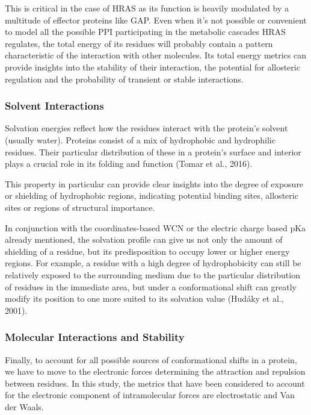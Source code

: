 \documentclass{article}
\begin{document}
This is critical in the case of HRAS as its function is heavily modulated by a multitude of effector proteins like GAP. Even when it’s not possible or convenient to model all the possible PPI participating in the metabolic cascades HRAS regulates, the total energy of its residues will probably contain a pattern characteristic of the interaction with other molecules. Its total energy metrics can provide insights into the stability of their interaction, the potential for allosteric regulation and the probability of transient or stable interactions.

\subsubsection{Solvent Interactions}

Solvation energies reflect how the residues interact with the protein’s solvent (usually water). Proteins consist of a mix of hydrophobic and hydrophilic residues. Their particular distribution of these in a protein’s surface and interior plays a crucial role in its folding and function (Tomar et al., 2016).

This property in particular can provide clear insights into the degree of exposure or shielding of hydrophobic regions, indicating potential binding sites, allosteric sites or regions of structural importance.

In conjunction with the coordinates-based WCN or the electric charge based pKa already mentioned, the solvation profile can give us not only the amount of shielding of a residue, but its predisposition to occupy lower or higher energy regions. For example, a residue with a high degree of hydrophobicity can still be relatively exposed to the surrounding medium due to the particular distribution of residues in the immediate area, but under a conformational shift can greatly modify its position to one more suited to its solvation value (Hudáky et al., 2001).

\subsubsection{Molecular Interactions and Stability}

Finally, to account for all possible sources of conformational shifts in a protein, we have to move to the electronic forces determining the attraction and repulsion between residues. In this study, the metrics that have been considered to account for the electronic component of intramolecular forces are electrostatic and Van der Waals.
\end{document}
